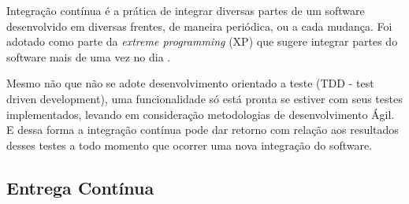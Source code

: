 Integração contínua é a prática de integrar diversas partes de um software
desenvolvido em diversas frentes, de maneira periódica, ou a cada mudança.
Foi adotado como parte da \textit{extreme programming} (XP) que sugere integrar
partes do software mais de uma vez no dia \cite{fowler2006continuous}.

Mesmo não que não se adote desenvolvimento orientado a teste (TDD - test driven 
development), uma funcionalidade só está pronta se estiver com seus testes 
implementados, levando em consideração metodologias de desenvolvimento Ágil. 
E dessa forma a integração contínua pode dar retorno com relação aos resultados
desses testes a todo momento que ocorrer uma nova integração do software.

\subsection{Entrega Contínua}

